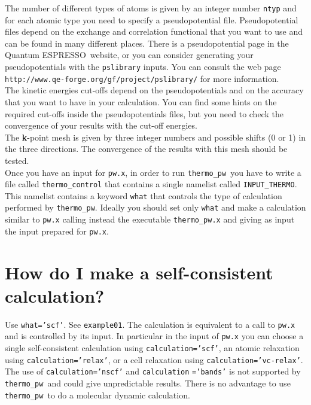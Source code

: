 \documentclass[12pt,a4paper]{article}
\def\qe{{\sc Quantum ESPRESSO}}
\def\thermo{\texttt{thermo\_pw}}
\begin{document}
The number of different types of atoms is given by an integer number 
\texttt{ntyp} and for each atomic type you need to specify a 
pseudopotential file. Pseudopotential files depend on the exchange and 
correlation functional that you want to use and can be found in many 
different places. There is a pseudopotential page in the \qe\ website, or 
you can consider generating your pseudopotentials with the \texttt{pslibrary} 
inputs. You can consult the web page \texttt{http://www.qe-forge.org/gf/project/pslibrary/} for more information. \\

The kinetic energies cut-offs depend on the pseudopotentials
and on the accuracy that you want to have in your calculation. You can 
find some hints on the required cut-offs inside the pseudopotentials files,
but you need to check the convergence of your results with the cut-off 
energies. \\

The {\bf k}-point mesh is given by three integer numbers and possible
shifts (0 or 1) in the three directions. The convergence of the results
with this mesh should be tested. \\

Once you have an input for \texttt{pw.x}, in order to run \thermo\ you
have to write a file called \texttt{thermo\_control} that contains a single
namelist called \texttt{INPUT\_THERMO}. This namelist contains a keyword
\texttt{what} that controls the type of calculation performed by 
\thermo. Ideally you should set only \texttt{what} and make a calculation
similar to \texttt{pw.x} calling instead the executable \texttt{thermo\_pw.x}
and giving as input the input prepared for \texttt{pw.x}.

\section{\color{coral}How do I make a self-consistent calculation?}
Use \texttt{what='scf'}. See \texttt{example01}. The calculation is
equivalent to a call to \texttt{pw.x} and is controlled by
its input. In particular in the input of \texttt{pw.x} you can choose
a single self-consistent calculation using \texttt{calculation='scf'}, 
an atomic relaxation using \texttt{calculation='relax'}, or a cell relaxation 
using \texttt{calculation='vc-relax'}.
The use of \texttt{calculation='nscf'} and \texttt{calculation}
\texttt{='bands'} is
not supported by \thermo\ and could give unpredictable results.
There is no advantage to use \thermo\ to do a molecular dynamic
calculation. 
\end{document}
